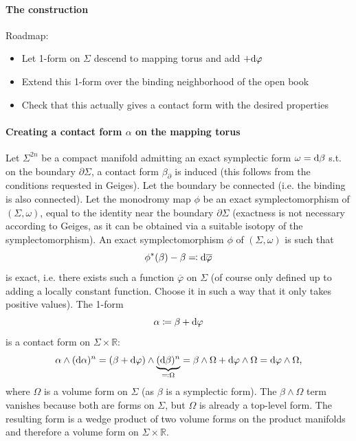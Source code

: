 \paragraph*{The construction}
Roadmap: 
\begin{itemize}
    \item Let 1-form on $\Sigma$ descend to mapping torus and add $+ \mathrm{d} \varphi$
    \item Extend this 1-form over the binding neighborhood of the open book
    \item Check that this actually gives a contact form with the desired properties
\end{itemize}

\paragraph*{Creating a contact form $\alpha$ on the mapping torus}
Let $\Sigma^{2n}$ be a compact manifold admitting an exact symplectic form $\omega = \mathrm{d} \beta$ s.t. on the boundary $\partial \Sigma$, a contact form $\beta_\partial$ is induced (this follows from the conditions requested in Geiges).
Let the boundary be connected (i.e. the binding is also connected).
Let the monodromy map $\phi$ be an exact symplectomorphism of $(\Sigma, \omega)$,
equal to the identity near the boundary $\partial \Sigma$ (exactness is not necessary according to Geiges, as it can be obtained via a suitable isotopy of the symplectomorphism).
An exact symplectomorphism $\phi$ of $(\Sigma, \omega)$ is such that
\[
    \phi^*(\beta) - \beta \eqqcolon \mathrm{d} \overline{\varphi}  
\]
is exact, i.e. there exists such a function $\overline{\varphi}$ on $\Sigma$ (of course only defined up to adding a locally constant function. Choose it in such a way that it only takes positive values).
The 1-form 
\[
    \alpha \coloneqq \beta + \mathrm{d} \varphi
\]
is a contact form on $\Sigma \times \mathbb R$:
\[
    \alpha \wedge (\mathrm{d} \alpha)^{n} = (\beta + \mathrm{d} \varphi)\wedge \underbrace{(\mathrm{d} \beta)^n}_{\eqqcolon \Omega} = \beta \wedge \Omega + \mathrm{d} \varphi \wedge \Omega = \mathrm{d} \varphi \wedge \Omega,
\]
where $\Omega$ is a volume form on $\Sigma$ (as $\beta$ is a symplectic form).
The $\beta \wedge \Omega$ term vanishes because both are forms on $\Sigma$, but $\Omega$ is already a top-level form.
The resulting form is a wedge product of two volume forms on the product manifolds and therefore a volume form on $\Sigma \times \mathbb R$.

